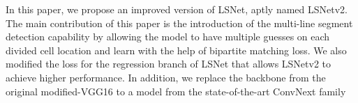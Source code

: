 \documentclass[journal]{IEEEtran}
\begin{document}
In this paper, we propose an improved version of LSNet, aptly named LSNetv2. The main contribution of this paper is the introduction of the multi-line segment detection capability by allowing the model to have multiple guesses on each divided cell location and learn with the help of bipartite matching loss. We also modified the loss for the regression branch of LSNet that allows LSNetv2 to achieve higher performance. In addition, we replace the backbone from the original modified-VGG16 \cite{vgg} to a model from the state-of-the-art ConvNext family \cite{convnext}


%
%



%
%
\end{document}
